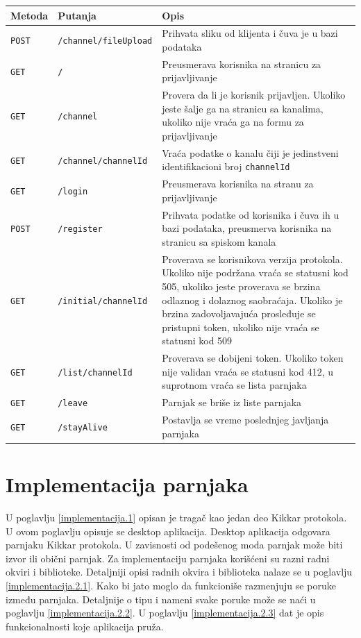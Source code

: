 \documentclass[12pt,oneside]{memoir}
\begin{document}
\begin{center}
\begin{tabular}{ |p{1.5cm}|p{4cm}|p{8cm}| } 
\hline
Metoda & Putanja & Opis \\
\hline
\texttt{POST} & \texttt{/channel/fileUpload} & Prihvata sliku od klijenta i čuva je u bazi podataka \\
\texttt{GET} & \texttt{/} & Preusmerava korisnika na stranicu za prijavljivanje \\ 
\texttt{GET} & \texttt{/channel} & Provera da li je korisnik prijavljen. Ukoliko jeste šalje ga na stranicu sa kanalima, ukoliko nije vraća ga na formu za prijavljivanje \\ 
\texttt{GET} & \texttt{/channel/{channelId}} & Vraća podatke o kanalu čiji je jedinstveni identifikacioni broj \texttt{{channelId}}\\
\texttt{GET} & \texttt{/login} & Preusmerava korisnika na stranu za prijavljivanje \\ 
\texttt{POST} & \texttt{/register} & Prihvata podatke od korisnika i čuva ih u bazi podataka, preusmerva korisnika na stranicu sa spiskom kanala \\ 
\texttt{GET} & \texttt{/initial/{channelId}} & Proverava se korisnikova verzija protokola. Ukoliko nije podržana vraća se statusni kod 505, ukoliko jeste proverava se brzina odlaznog i dolaznog saobraćaja. Ukoliko je brzina zadovoljavajuća prosleđuje se pristupni token, ukoliko nije vraća se statusni kod 509 \\ 
\texttt{GET} & \texttt{/list/{channelId}} & Proverava se dobijeni token. Ukoliko token nije validan vraća se statusni kod 412, u suprotnom vraća se lista parnjaka \\ 
\texttt{GET} & \texttt{/leave} & Parnjak se briše iz liste parnjaka \\ 
\texttt{GET} & \texttt{/stayAlive} & Postavlja se vreme poslednjeg javljanja parnjaka \\ 
\hline
\end{tabular}
\end{center}


\section{Implementacija parnjaka}
\label{implementacija.2}

U poglavlju \ref{implementacija.1} opisan je tragač kao jedan deo Kikkar protokola. U ovom poglavlju opisuje se desktop aplikacija. Desktop aplikacija odgovara parnjaku Kikkar protokola. U zavisnosti od podešenog moda parnjak može biti izvor ili obični parnjak. Za implementaciju parnjaka korišćeni su razni radni okviri i biblioteke. Detaljniji opisi radnih okvira i biblioteka nalaze se u poglavlju \ref{implementacija.2.1}. Kako bi jato moglo da funkcioniše razmenjuju se poruke između parnjaka. Detaljnije o tipu i nameni svake poruke može se naći u poglavlju \ref{implementacija.2.2}. U poglavlju \ref{implementacija.2.3} dat je opis funkcionalnosti koje aplikacija pruža.
\end{document}
